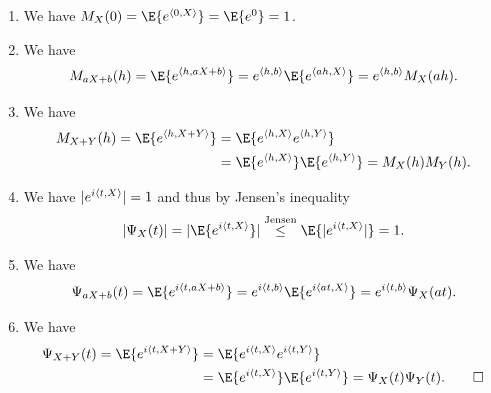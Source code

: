 \begin{solution}
    \begin{enumerate}[wide=0pt, noitemsep]
    \item[\ref{it: (mgf) zero}] We have
    \(\MGF_X(0) = \E{e^{\scp{0, X}}} = \E{e^0} = 1\).
    \item[\ref{it: (mgf) linear transformation}] We have
    \[
        \MGF_{aX + b}(h) = \E{e^{\scp{h, aX + b}}}
        = e^{\scp{h, b}} \E{e^{\scp{a h, X}}}
        = e^{\scp{h,b}} \MGF_X(a h).
    \]
    \item[\ref{it: (mgf) idependent sum}] We have
    \[
    \begin{aligned}
        \MGF_{X+Y}(h) = \E{e^{\scp{h, X+Y}}}
        &= \E{e^{\scp{h, X}} e^{\scp{h, Y}}}
        \\
        &= \E{e^{\scp{h, X}}} \E{e^{\scp{h, Y}}}
        = \MGF_X(h) \MGF_Y(h).
    \end{aligned}
    \]

    \item[\ref{it: (charfct) bounded}] We have \(\lvert e^{i\langle t, X\rangle}\rvert = 1\) and thus
    by Jensen's inequality
    \[
        \abs{\charFct_X(t)} = \abs{\E{e^{i\scp{t, X}}}} \overset{\text{Jensen}}\le \E{\abs{e^{i\scp{t, X}}}} = 1.
    \]
    \item[\ref{it: (charfct) linear transformation}] We have
    \[
        \charFct_{aX + b}(t) = \E{e^{i\scp{t, aX + b}}}
        = e^{i\scp{t, b}} \E{e^{i\scp{a t, X}}}
        = e^{i\scp{t,b}} \charFct_X(a t).
    \]
    \item[\ref{it: (charfct) independent sum}] We have
    \begin{align*}
        \charFct_{X+Y}(t) = \E{e^{i\scp{t, X+Y}}}
        &= \E{e^{i\scp{t, X}} e^{i\scp{t, Y}}}
        \\
        &= \E{e^{i\scp{t, X}}} \E{e^{i\scp{t, Y}}}
        = \charFct_X(t) \charFct_Y(t).
        \qedhere
    \end{align*}
    \end{enumerate}
\end{solution}
